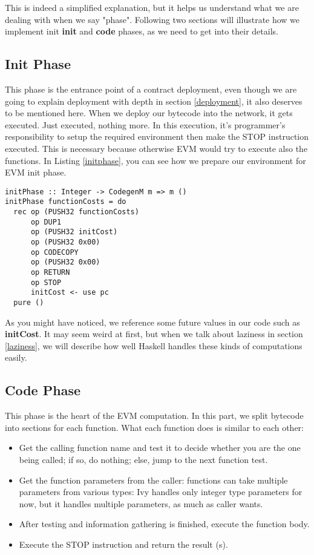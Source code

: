 \documentclass{article}
\begin{document}
This is indeed a simplified explanation, but it helps us understand what we are dealing with when we say "phase".
Following two sections will illustrate how we implement init \textbf{init} and \textbf{code} phases, as we need to get into their details.
\subsection{Init Phase}
This phase is the entrance point of a contract deployment, even though we are going to explain deployment with depth in section \ref{deployment}, it also deserves to be mentioned here. When we deploy our bytecode into the network, it gets executed. Just executed, nothing more. In this execution, it's programmer's responsibility to setup the required environment then make the STOP instruction executed. This is necessary because otherwise EVM would try to execute also the functions. In Listing \ref{initphase}, you can see how we prepare our environment for EVM init phase. \\
\begin{lstlisting}[label=initphase,caption=Init Phase]
initPhase :: Integer -> CodegenM m => m ()
initPhase functionCosts = do
  rec op (PUSH32 functionCosts)
      op DUP1
      op (PUSH32 initCost)
      op (PUSH32 0x00)
      op CODECOPY
      op (PUSH32 0x00)
      op RETURN
      op STOP
      initCost <- use pc
  pure ()
\end{lstlisting}
As you might have noticed, we reference some future values in our code such as \textbf{initCost}. It may seem weird at first, but when we talk about laziness in section \ref{laziness}, we will describe how well Haskell handles these kinds of computations easily.
\subsection{Code Phase}
\label{subsec:code_phase}
This phase is the heart of the EVM computation. In this part, we split bytecode into sections for each function. What each function does is similar to each other:
\begin{itemize}
  \item Get the calling function name and test it to decide whether you are the one being called; if so, do nothing; else, jump to the next function test.
  \item Get the function parameters from the caller: functions can take multiple parameters from various types: Ivy handles only integer type parameters for now, but it handles multiple parameters, as much as caller wants.
  \item After testing and information gathering is finished, execute the function body.
  \item Execute the STOP instruction and return the result (s).
\end{itemize}
\end{document}
